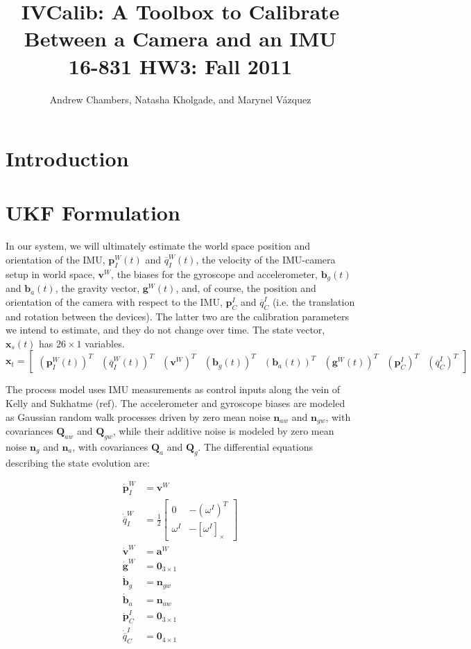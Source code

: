 \documentclass[letterpaper]{article}
\title{
  IVCalib: A Toolbox to Calibrate Between a Camera and an IMU\\
  \Large{16-831 HW3: Fall 2011}
}
\author{Andrew Chambers, Natasha Kholgade, and Marynel V\'azquez}
\date{}
\newcommand{\bb}[1]{\mathbf{#1}}
\begin{document}
\maketitle

\section{Introduction}

\section{UKF Formulation}

In our system, we will ultimately estimate the world space position and orientation of the IMU, $\bb{p}_I^W(t)$ and ${\overline{q}}_I^W(t)$, the velocity of the IMU-camera setup in world space, $\bb{v}^W$, the biases for the gyroscope and accelerometer, $\bb{b}_g(t)$ and $\bb{b}_a(t)$, the gravity vector, $\bb{g}^W(t)$, and, of course, the position and orientation of the camera with respect to the IMU, $\bb{p}_C^I$ and $\overline{q}_C^I$ (i.e. the translation and rotation between the devices). The latter two are the calibration parameters we intend to estimate, and they do not change over time. The state vector, $\bb{x}_s(t)$ has $26 \times 1$ variables.
\begin{equation}
\bb{x}_t=\begin{bmatrix} (\bb{p}_I^W(t))^T & ({\overline{q}}_I^W(t))^T  & (\bb{v}^W)^T  & (\bb{b}_g(t))^T &  (\bb{b}_a(t))^T & (\bb{g}^W(t))^T  & (\bb{p}_C^I)^T & (\overline{q}_C^I)^T\end{bmatrix}
\end{equation}

The process model uses IMU measurements as control inputs along the vein of Kelly and Sukhatme (ref). The accelerometer and gyroscope biases are modeled as Gaussian random walk processes driven by zero mean noise $\bb{n}_{aw}$ and $\bb{n}_{gw}$, with covariances $\bb{Q}_{aw}$ and $\bb{Q}_{gw}$, while their additive noise is modeled by zero mean noise $\bb{n}_g$ and $\bb{n}_a$, with covariances $\bb{Q}_a$ and $\bb{Q}_g$. The differential equations describing the state evolution are:

\begin{align}
\dot{\bb{p}}_I^W &=\bb{v}^W \nonumber\\ 
\dot{\overline{q}}_I^W&=\frac{1}{2}\begin{bmatrix}0 & -(\omega^I)^T \\ \omega^I & -[ \omega^I ]_{\times} \end{bmatrix}  \nonumber\\
\dot{\bb{v}}^W &=\bb{a}^W  \nonumber\\
\dot{\bb{g}}^W &=\bb{0}_{3 \times 1}  \nonumber\\
\dot{\bb{b}}_g&=\bb{n}_{gw}  \nonumber\\
\dot{\bb{b}}_a&=\bb{n}_{aw}  \nonumber\\
\dot{\bb{p}}_C^I&=\bb{0}_{3 \times 1} \nonumber\\
\dot{\overline{q}}_C^I&=\bb{0}_{4 \times 1}
\end{align}
\end{document}
